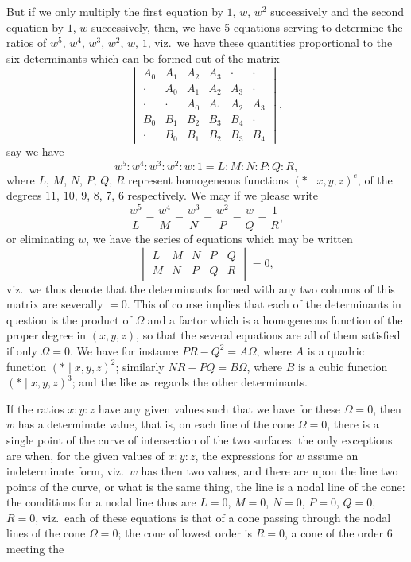 \documentclass[11pt]{article}
\begin{document}
\medskip\noindent
But if we only multiply the first equation by $1$, $w$, $w^{2}$ successively and the second equation by $1$, $w$ successively, then, we have 5 equations serving to determine the ratios of $w^{5}$, $w^{4}$, $w^{3}$, $w^{2}$, $w$, $1$, viz.\ we have these quantities proportional to the six determinants which can be formed out of the matrix
\[
\begin{vmatrix}
A_{0} & A_{1} & A_{2} & A_{3} & \cdot & \cdot \\
\cdot & A_{0} & A_{1} & A_{2} & A_{3} & \cdot \\
\cdot & \cdot & A_{0} & A_{1} & A_{2} & A_{3} \\
B_{0} & B_{1} & B_{2} & B_{3} & B_{4} & \cdot \\
\cdot & B_{0} & B_{1} & B_{2} & B_{3} & B_{4}
\end{vmatrix},
\]
say we have
\[
w^{5} : w^{4} : w^{3} : w^{2} : w : 1 = L : M : N : P : Q : R,
\]
where $L$, $M$, $N$, $P$, $Q$, $R$ represent homogeneous functions $(*\!\mid\! x, y, z)^{e}$, of the degrees $11$, $10$, $9$, $8$, $7$, $6$ respectively.  We may if we please write
\[
\frac{w^{5}}{L} = \frac{w^{4}}{M} = \frac{w^{3}}{N} = \frac{w^{2}}{P} = \frac{w}{Q} = \frac{1}{R},
\]
or eliminating $w$, we have the series of equations which may be written
\[
\begin{vmatrix}
L & M & N & P & Q \\
M & N & P & Q & R
\end{vmatrix} = 0,
\]
viz.\ we thus denote that the determinants formed with any two columns of this matrix are severally $=0$.  This of course implies that each of the determinants in question is the product of $\Omega$ and a factor which is a homogeneous function of the proper degree in $(x, y, z)$, so that the several equations are all of them satisfied if only $\Omega = 0$.  We have for instance $PR - Q^{2} = A\Omega$, where $A$ is a quadric function $(*\!\mid\! x, y, z)^{2}$; similarly $NR - PQ = B\Omega$, where $B$ is a cubic function $(*\!\mid\! x, y, z)^{3}$; and the like as regards the other determinants.

\medskip\noindent
If the ratios $x : y : z$ have any given values such that we have for these $\Omega = 0$, then $w$ has a determinate value, that is, on each line of the cone $\Omega = 0$, there is a single point of the curve of intersection of the two surfaces: the only exceptions are when, for the given values of $x : y : z$, the expressions for $w$ assume an indeterminate form, viz.\ $w$ has then two values, and there are upon the line two points of the curve, or what is the same thing, the line is a nodal line of the cone: the conditions for a nodal line thus are $L = 0$, $M = 0$, $N = 0$, $P = 0$, $Q = 0$, $R = 0$, viz.\ each of these equations is that of a cone passing through the nodal lines of the cone $\Omega = 0$; the cone of lowest order is $R = 0$, a cone of the order $6$ meeting the
\end{document}
